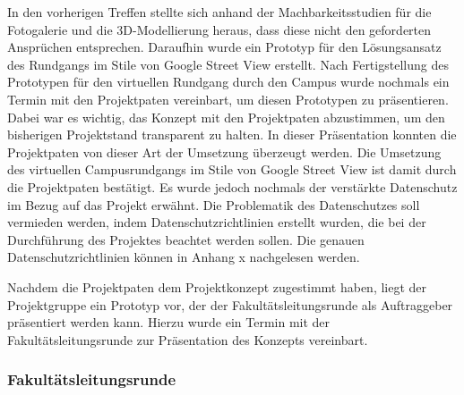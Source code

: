In den vorherigen Treffen stellte sich anhand der Machbarkeitsstudien für die Fotogalerie und die 3D-Modellierung heraus, 
dass diese nicht den geforderten Ansprüchen entsprechen. Daraufhin wurde ein Prototyp für den Lösungsansatz des Rundgangs 
im Stile von Google Street View erstellt.
Nach Fertigstellung des Prototypen für den virtuellen Rundgang durch den Campus wurde nochmals ein Termin mit den 
Projektpaten vereinbart, um diesen Prototypen zu präsentieren. Dabei war es wichtig, das Konzept mit den Projektpaten 
abzustimmen, um den bisherigen Projektstand transparent zu halten. In dieser Präsentation konnten die 
Projektpaten von dieser Art der
Umsetzung überzeugt werden. Die Umsetzung des virtuellen Campusrundgangs im Stile von Google Street View ist
damit durch die Projektpaten bestätigt. Es wurde jedoch nochmals der verstärkte Datenschutz im Bezug auf das Projekt 
erwähnt. Die Problematik des Datenschutzes soll vermieden werden, indem Datenschutzrichtlinien erstellt wurden, die bei 
der 
Durchführung des Projektes beachtet werden sollen. Die genauen Datenschutzrichtlinien können in Anhang x nachgelesen
werden.

Nachdem die Projektpaten dem Projektkonzept zugestimmt haben, liegt der Projektgruppe ein Prototyp vor, der der 
Fakultätsleitungsrunde als Auftraggeber präsentiert werden kann.
Hierzu wurde ein Termin mit der Fakultätsleitungsrunde zur Präsentation des Konzepts vereinbart.




\subsubsection*{Fakultätsleitungsrunde}
\label{sec:Treffen4}

